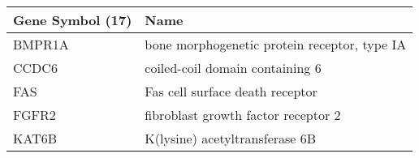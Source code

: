 \begin{tabular}{ll}
\toprule
Gene Symbol (17) &                                         Name \\
\midrule
          BMPR1A & bone morphogenetic protein receptor, type IA \\
           CCDC6 &              coiled-coil domain containing 6 \\
             FAS &              Fas cell surface death receptor \\
           FGFR2 &          fibroblast growth factor receptor 2 \\
           KAT6B &               K(lysine) acetyltransferase 6B \\
\bottomrule
\end{tabular}

